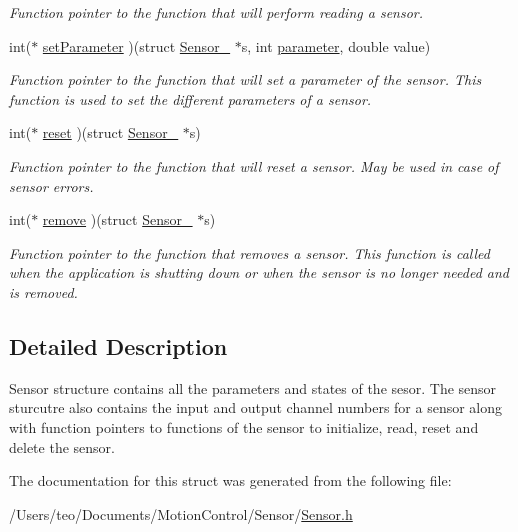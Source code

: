 \begin{DoxyCompactItemize}
\begin{DoxyCompactList}\small\item\em Function pointer to the function that will perform reading a sensor. \end{DoxyCompactList}\item 
\mbox{\label{struct_sensor___a4e7153724f8cadbba60592be9d1e5314}} 
int($\ast$ \hyperlink{struct_sensor___a4e7153724f8cadbba60592be9d1e5314}{set\+Parameter} )(struct \hyperlink{struct_sensor__}{Sensor\+\_\+} $\ast$s, int \hyperlink{struct_sensor___a9daac12cfa19a687feaefc738aaf535a}{parameter}, double value)
\begin{DoxyCompactList}\small\item\em Function pointer to the function that will set a parameter of the sensor. This function is used to set the different parameters of a sensor. \end{DoxyCompactList}\item 
\mbox{\label{struct_sensor___a76cd20fad5d4f00d0c62171c624447fd}} 
int($\ast$ \hyperlink{struct_sensor___a76cd20fad5d4f00d0c62171c624447fd}{reset} )(struct \hyperlink{struct_sensor__}{Sensor\+\_\+} $\ast$s)
\begin{DoxyCompactList}\small\item\em Function pointer to the function that will reset a sensor. May be used in case of sensor errors. \end{DoxyCompactList}\item 
\mbox{\label{struct_sensor___a37dd197f3370d6023b3eb53111f24e3c}} 
int($\ast$ \hyperlink{struct_sensor___a37dd197f3370d6023b3eb53111f24e3c}{remove} )(struct \hyperlink{struct_sensor__}{Sensor\+\_\+} $\ast$s)
\begin{DoxyCompactList}\small\item\em Function pointer to the function that removes a sensor. This function is called when the application is shutting down or when the sensor is no longer needed and is removed. \end{DoxyCompactList}\end{DoxyCompactItemize}


\subsection{Detailed Description}
Sensor structure contains all the parameters and states of the sesor. The sensor sturcutre also contains the input and output channel numbers for a sensor along with function pointers to functions of the sensor to initialize, read, reset and delete the sensor. 

The documentation for this struct was generated from the following file\+:\begin{DoxyCompactItemize}
\item 
/\+Users/teo/\+Documents/\+Motion\+Control/\+Sensor/\hyperlink{_sensor_8h}{Sensor.\+h}\end{DoxyCompactItemize}
